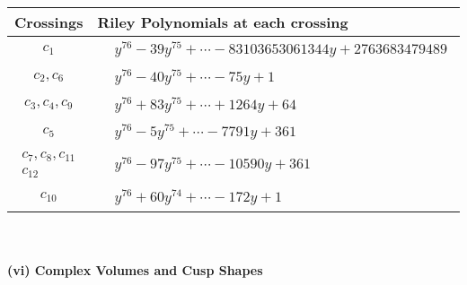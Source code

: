 \documentclass[1p]{elsarticle_modified}
\theoremstyle{definition}
\begin{document}
\begin{tabular}{m{50pt}|m{274pt}}
Crossings & \hspace{64pt}Riley Polynomials at each crossing \\
\hline $$\begin{aligned}c_{1}\end{aligned}$$&$\begin{aligned}
&y^{76}-39 y^{75}+\cdots-83103653061344 y+2763683479489
\end{aligned}$\\
\hline $$\begin{aligned}c_{2},c_{6}\end{aligned}$$&$\begin{aligned}
&y^{76}-40 y^{75}+\cdots-75 y+1
\end{aligned}$\\
\hline $$\begin{aligned}c_{3},c_{4},c_{9}\end{aligned}$$&$\begin{aligned}
&y^{76}+83 y^{75}+\cdots+1264 y+64
\end{aligned}$\\
\hline $$\begin{aligned}c_{5}\end{aligned}$$&$\begin{aligned}
&y^{76}-5 y^{75}+\cdots-7791 y+361
\end{aligned}$\\
\hline $$\begin{aligned}c_{7},c_{8},c_{11}\\c_{12}\end{aligned}$$&$\begin{aligned}
&y^{76}-97 y^{75}+\cdots-10590 y+361
\end{aligned}$\\
\hline $$\begin{aligned}c_{10}\end{aligned}$$&$\begin{aligned}
&y^{76}+60 y^{74}+\cdots-172 y+1
\end{aligned}$\\
\hline
\end{tabular}\\~\\
\newpage\flushleft \textbf{(vi) Complex Volumes and Cusp Shapes}
\end{document}
